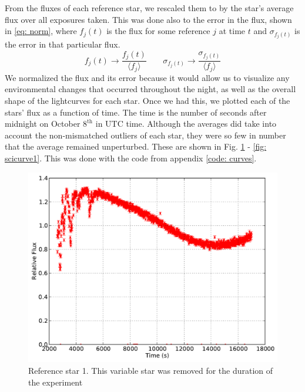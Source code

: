 \documentclass{aastex61}
\begin{document}
From the fluxes of each reference star, we rescaled them to by the star's average flux over all exposures taken. This was done also to the error in the flux, shown in \eqref{eq: norm}, where $f_{j}(t)$ is the flux for some reference $j$ at time $t$ and $\sigma_{f_{j}(t)}$ is the error in that particular flux.
\begin{equation} \label{eq: norm}
f_{j}(t)  \rightarrow \frac{f_{j}(t)}{\langle f_{j} \rangle}       \;\;\;\;\;\;\;\sigma_{f_{j}(t)} \rightarrow \frac{\sigma_{f_{j}(t)}}{\langle f_{j} \rangle}
\end{equation}
We normalized the flux and its error because it would allow us to visualize any environmental changes that occurred throughout the night, as well as the overall shape of the lightcurves for each star. Once we had this, we plotted each of the stars' flux as a function of time. The time is the number of seconds after midnight on October $8^{\text{th}}$ in UTC time. Although the averages did take into account the non-mismatched outliers of each star, they were so few in number that the average remained unperturbed. These are shown in Fig. \ref{fig: refcurve1} - \ref{fig: scicurve1}. This was done with the code from appendix \ref{code: curves}. 
\begin{figure}[hbt!]
	\centering
	\includegraphics[scale = .45]{exo_curves1.pdf}
    \caption{Reference star 1. This variable star was removed for the duration of the experiment}
    \label{fig: refcurve1}
\end{figure}
\end{document}

